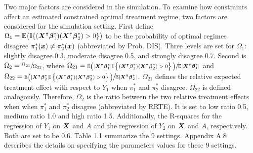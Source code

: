 Two major factors are considered in the simulation. To examine how constraints affect an estimated constrained optimal treatment regime, two factors are considered for the simulation setting. First define $\Omega_{1}= \mathbb{E}\big(\mathbb{I}\{(\boldsymbol{X}^{\intercal}\boldsymbol{\beta}^*_1)(\boldsymbol{X}^{\intercal}\boldsymbol{\beta}^{*}_{2}) > 0\}\big)$ to be the probability of optimal regimes disagree $\pi^{*}_{1}(\boldsymbol{x}) \ne \pi^{*}_{2}(\boldsymbol{x})$ (abbreviated by Prob. DIS). Three levels are set for $\Omega_{1}$: slightly disagree 0.3, moderate disagree 0.5, and strongly disagree 0.7. Second is $\Omega_2 = \sfrac{\Omega_{21}}{\Omega_{22}}$, where $\Omega_{21} = \sfrac{
\mathbb{E}\big(|\boldsymbol{X}^{\intercal}\boldsymbol{\beta}^*_1|\mathbb{I}\left\{(\boldsymbol{X}^{\intercal}\boldsymbol{\beta}^*_1)(\boldsymbol{X}^{\intercal}\boldsymbol{\beta}^{*}_{2})>0\right\}\big)}{\mathbb{E}|\boldsymbol{X}^{\intercal}\boldsymbol{\beta}^*_1|}$ and $\Omega_{22} = \sfrac{
\mathbb{E}\big(|\boldsymbol{X}^{\intercal}\boldsymbol{\beta}^*_2|\mathbb{I}\left\{(\boldsymbol{X}^{\intercal}\boldsymbol{\beta}^*_1)(\boldsymbol{X}^{\intercal}\boldsymbol{\beta}^{*}_{2})>0\right\}\big)}{\mathbb{E}|\boldsymbol{X}^{\intercal}\boldsymbol{\beta}^*_2|}$.  $\Omega_{21}$ defines the relative expected treatment effect with respect to $Y_1$ when $\pi^{*}_{1}$ and $\pi^{*}_{2}$ disagree. $\Omega_{22}$ is defined analogously. Therefore, $\Omega_{2}$ is the ratio between the two relative treatment effects when when $\pi^{*}_{1}$ and $\pi^{*}_{2}$ disagree (abbreviated by RRTE). It is set to low ratio 0.5, medium ratio 1.0 and high ratio 1.5. Additionally, the R-squares for the regression of $Y_1$ on $\boldsymbol{X}$ and $A$ and the regression of $Y_2$ on $\boldsymbol{X}$ and $A$, respectively. Both are set to be 0.6.  Table 1.1 summarize the 9 settings. Appendix A.8 describes the details on specifying the parameters values for these 9 settings. \\
